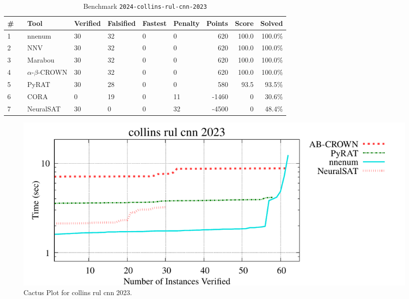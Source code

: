 \begin{table}[h]
\begin{center}
\caption{Benchmark \texttt{2024-collins-rul-cnn-2023}} \label{tab:cat_{cat}}
{\setlength{\tabcolsep}{2pt}
\begin{tabular}[h]{@{}llllllrrr@{}}
\toprule
\textbf{\# ~} & \textbf{Tool} & \textbf{Verified} & \textbf{Falsified} & \textbf{Fastest} & \textbf{Penalty} & \textbf{Points} & \textbf{Score} & \textbf{Solved}\\
\midrule
1 & nnenum & 30 & 32 & 0 & 0 & 620 & 100.0 & 100.0\% \\
2 & NNV & 30 & 32 & 0 & 0 & 620 & 100.0 & 100.0\% \\
3 & Marabou & 30 & 32 & 0 & 0 & 620 & 100.0 & 100.0\% \\
4 & $\alpha$-$\beta$-CROWN & 30 & 32 & 0 & 0 & 620 & 100.0 & 100.0\% \\
5 & PyRAT & 30 & 28 & 0 & 0 & 580 & 93.5 & 93.5\% \\
6 & CORA & 0 & 19 & 0 & 11 & -1460 & 0 & 30.6\% \\
7 & NeuralSAT & 30 & 0 & 0 & 32 & -4500 & 0 & 48.4\% \\
\bottomrule
\end{tabular}
}
\end{center}
\end{table}



\begin{figure}[h]
\centerline{\includegraphics[width=\textwidth]{cactus/2024_collins_rul_cnn_2023.pdf}}
\caption{Cactus Plot for collins rul cnn 2023.}
\label{fig:quantPic}
\end{figure}


\clearpage

